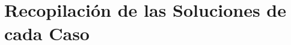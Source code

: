 \section{Recopilación de las Soluciones de cada Caso} \label{Anexo:recopilacion-soluciones-por-fases}
